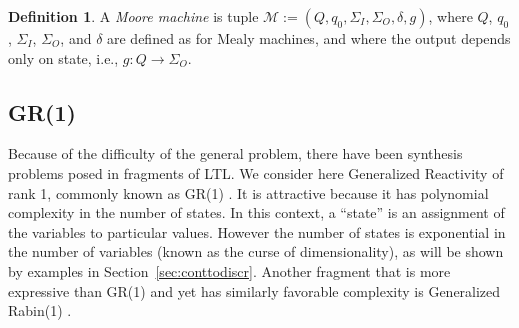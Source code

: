 \documentclass{amsart}
\theoremstyle{plain}
\theoremstyle{definition}
\newtheorem{defn}{Definition}
\theoremstyle{definition}
\begin{document}
\begin{defn}
A \textit{Moore machine} is tuple $\mathcal{M}:=\left(Q,q_{0},\Sigma_{I},\Sigma_{O},\delta,g\right)$,
where $Q$, $q_{0}$, $\Sigma_{I}$, $\Sigma_{O}$, and $\delta$
are defined as for Mealy machines, and where the output depends only
on state, i.e., $g:Q\rightarrow\Sigma_{O}$.
\end{defn}


\subsection{GR(1)}

Because of the difficulty of the general problem, there have been synthesis
problems posed in fragments of LTL.  We consider here Generalized Reactivity of
rank 1, commonly known as GR(1) \cite{KestenPP2005,BloemJPPS2012}.  It is
attractive because it has polynomial complexity in the number of states.  In
this context, a ``state'' is an assignment of the variables to particular
values.  However the number of states is exponential in the number of variables
(known as the curse of dimensionality), as will be shown by examples in
Section~\ref{sec:conttodiscr}.  Another fragment that is more expressive than
GR(1) and yet has similarly favorable complexity is Generalized Rabin(1)
\cite{Ehlers2011}.
\end{document}
